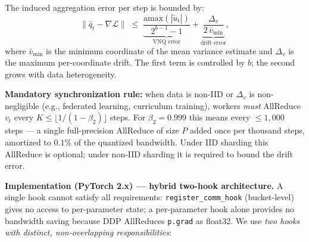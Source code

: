 \documentclass[10pt,twocolumn]{article}
\begin{document}
\begin{enumerate}
    The induced aggregation error per step is bounded by:
    \[
      \bigl\|\bar{q}_t - \nabla\mathcal{L}\bigr\| \;\leq\;
      \underbrace{\frac{\mathrm{amax}(|\tilde{u}_t|)}{2^{b-1}-1}}_{\text{VNQ error}} +
      \underbrace{\frac{\Delta_v}{2\,\bar{v}_{\min}}}_{\text{drift error}},
    \]
    where $\bar{v}_{\min}$ is the minimum coordinate of the mean variance
    estimate and $\Delta_v$ is the maximum per-coordinate drift.  The
    first term is controlled by $b$; the second grows with data heterogeneity.

    \textbf{Mandatory synchronization rule:} when data is non-IID or
    $\Delta_v$ is non-negligible (e.g., federated learning, curriculum
    training), workers \emph{must} AllReduce $v_t$ every
    $K \leq \lfloor 1/(1-\beta_2) \rfloor$ steps.  For $\beta_2 = 0.999$
    this means every $\leq 1{,}000$ steps — a single full-precision
    AllReduce of size $P$ added once per thousand steps, amortized to
    $0.1\%$ of the quantized bandwidth.  Under IID sharding this
    AllReduce is optional; under non-IID sharding it is required to
    bound the drift error.
\end{enumerate}

\noindent
\textbf{Implementation (PyTorch 2.x) — hybrid two-hook architecture.}
A single hook cannot satisfy all requirements: \texttt{register\_comm\_hook}
(bucket-level) gives no access to per-parameter state; a per-parameter hook
alone provides no bandwidth saving because DDP AllReduces \texttt{p.grad} as
float32.  We use \emph{two hooks with distinct, non-overlapping responsibilities}:
\end{document}
